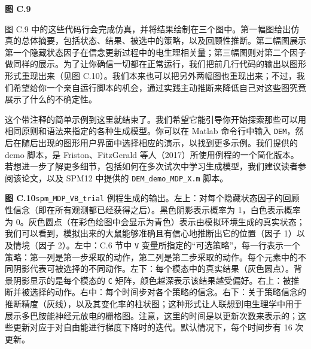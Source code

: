 \noindent\textbf{图 C.9}

图 C.9 中的这些代码行会完成仿真，并将结果绘制在三个图中。第一幅图给出仿真的总体摘要，包括状态、结果、被选中的策略，以及回顾性推断。第二幅图展示第一个隐藏状态因子在信念更新过程中的电生理相关量；第三幅图则对第二个因子做同样的展示。为了让你确信一切都在正常运行，我们把前几行代码的输出以图形形式重现出来（见图 C.10）。我们本来也可以把另外两幅图也重现出来；不过，我们希望给你一个亲自运行脚本的机会，通过实践主动推断来降低自己对这些图究竟展示了什么的不确定性。

这个带注释的简单示例到这里就结束了。我们希望它能引导你开始探索那些可以用相同原则和语法来指定的各种生成模型。你可以在 Matlab 命令行中输入 \verb|DEM|，然后在随后出现的图形用户界面中选择相应的演示，以找到更多示例。我们提供的 demo 脚本，是 Friston、FitzGerald 等人（2017）所使用例程的一个简化版本。若想进一步了解更多细节，包括如何在多次试次中学习生成模型，我们建议读者参阅该论文，以及 SPM12 中提供的 \verb|DEM_demo_MDP_X.m| 脚本。

\noindent\textbf{图 C.10}\quad \verb|spm_MDP_VB_trial| 例程生成的输出。左上：对每个隐藏状态因子的回顾性信念（即在所有观测都已经获得之后）。黑色阴影表示概率为 1，白色表示概率为 0。灰色圆点（在彩色绘图中会显示为青色）表示由模拟环境生成的真实状态；我们可以看到，模拟出来的大鼠能够准确且有信心地推断出它的位置（因子 1）以及情境（因子 2）。左中：C.6 节中 \verb|V| 变量所指定的“可选策略”，每一行表示一个策略：第一列是第一步采取的动作，第二列是第二步采取的动作。每个元素中的不同阴影代表可被选择的不同动作。左下：每个模态中的真实结果（灰色圆点）。背景阴影显示的是每个模态的 \verb|C| 矩阵，颜色越深表示该结果越受偏好。右上：被推断并被选择的动作。右中：每个时间步对各个策略的信念。右下：关于策略信念的推断精度（灰线），以及其变化率的柱状图；这种形式让人联想到电生理学中用于展示多巴胺能神经元放电的栅格图。注意，这里的时间是以更新次数来表示的；这些更新对应于对自由能进行梯度下降时的迭代。默认情况下，每个时间步有 16 次更新。
